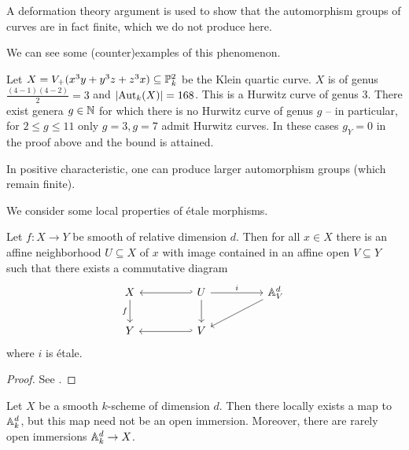 \begin{remark}
    A deformation theory argument is used to show that the automorphism groups of curves are in fact finite, which we do not produce here. 
\end{remark}
We can see some (counter)examples of this phenomenon. 
\begin{example}
    Let $X=V_{+}(x^{3}y+y^{3}z+z^{3}x)\subseteq\mathbb{P}^{2}_{k}$ be the Klein quartic curve. $X$ is of genus $\frac{(4-1)(4-2)}{2}=3$ and $|\mathrm{Aut}_{k}(X)|=168$. This is a Hurwitz curve of genus 3. There exist genera $g\in\mathbb{N}$ for which there is no Hurwitz curve of genus $g$ -- in particular, for $2\leq g\leq 11$ only $g=3,g=7$ admit Hurwitz curves. In these cases $g_{Y}=0$ in the proof above and the bound is attained. 
\end{example}
\begin{example}
    In positive characteristic, one can produce larger automorphism groups (which remain finite). 
\end{example}
We consider some local properties of \'{e}tale morphisms. 
\begin{proposition}\label{prop: smooth is etale and project}
    Let $f:X\to Y$ be smooth of relative dimension $d$. Then for all $x\in X$ there is an affine neighborhood $U\subseteq X$ of $x$ with image contained in an affine open $V\subseteq Y$ such that there exists a commutative diagram 
    $$%
    \begin{tikzcd}
        X && U && {\A^{d}_{V}} \\
        Y && V
        \arrow["f"', from=1-1, to=2-1]
        \arrow[hook', from=1-3, to=1-1]
        \arrow["i", from=1-3, to=1-5]
        \arrow[from=1-3, to=2-3]
        \arrow[from=1-5, to=2-3]
        \arrow[hook', from=2-3, to=2-1]
    \end{tikzcd}$$
    where $i$ is \'{e}tale. 
\end{proposition}
\begin{proof}
    See \cite[\href{https://stacks.math.columbia.edu/tag/039P}{Tag 039P}]{stacks-project}.
\end{proof}
\begin{example}
    Let $X$ be a smooth $k$-scheme of dimension $d$. Then there locally exists a map to $\mathbb{A}^{d}_{k}$, but this map need not be an open immersion. Moreover, there are rarely open immersions $\mathbb{A}^{d}_{k}\to X$. 
\end{example}
